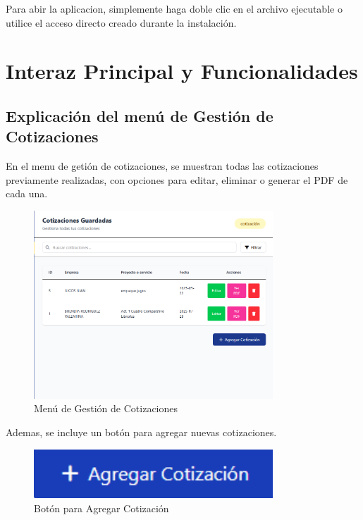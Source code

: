 \documentclass{Pretexto/bluereport}
\begin{document}
Para abir la aplicacion, simplemente haga doble clic en el archivo ejecutable o utilice el acceso directo creado durante la instalación.
\section{Interaz Principal y Funcionalidades}
\subsection{Explicación del menú de Gestión de Cotizaciones}

En el menu de getión de cotizaciones, se muestran todas las cotizaciones previamente realizadas, con opciones para editar, eliminar o generar el PDF de cada una.

\begin{figure}[H]
    \centering
    \includegraphics[width=0.8\textwidth]{img/gestion_cotizaciones.png}
    \caption{Menú de Gestión de Cotizaciones}
    \label{fig:gestion_cotizaciones}
\end{figure}

Ademas, se incluye un botón para agregar nuevas cotizaciones.

\begin{figure}[H]
    \centering
    \includegraphics[width=0.8\textwidth]{img/agregar_cotizacion.png}
    \caption{Botón para Agregar Cotización}
    \label{fig:agregar_cotizacion}
\end{figure}
\end{document}
